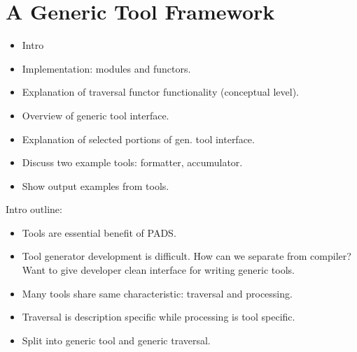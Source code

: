 \section{A Generic Tool Framework}
\label{sec:gen-tool}

\begin{itemize}
\item Intro
\item Implementation: modules and functors.
\item Explanation of traversal functor functionality (conceptual level).
\item Overview of generic tool interface.
\item Explanation of selected portions of gen. tool interface.
\item Discuss two example tools: formatter, accumulator.
\item Show output examples from tools.
\end{itemize}

Intro outline:
\begin{itemize}
\item Tools are essential benefit of PADS.
\item Tool generator development is difficult. How can we separate
  from compiler? Want to give developer clean interface for writing
  generic tools.
\item Many tools share same characteristic: traversal and processing.
\item Traversal is description specific while processing is tool specific.
\item Split into generic tool and generic traversal.
\end{itemize}

